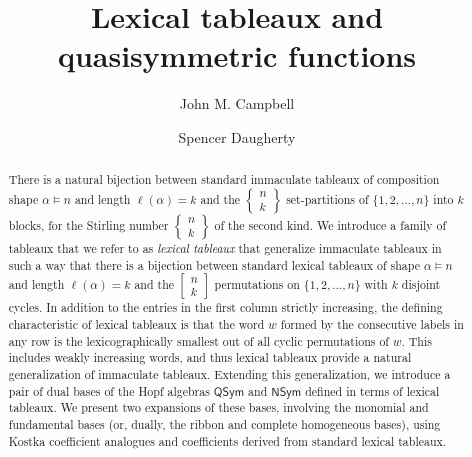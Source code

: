 \documentclass{amsart}
\title{Lexical tableaux and quasisymmetric functions}
\author[J. M. Campbell]{John M. Campbell}\address{Department of Mathematics and Statistics, Dalhousie University, Halifax, NS}\email{jh241966@dal.ca}
\author[S. Daugherty]{Spencer Daugherty}\address{Department of Mathematics, University of Colorado Boulder, Boulder, CO}\email{spencer.daugherty@colorado.edu}
\theoremstyle{definition}
\begin{document}
\maketitle

\begin{abstract}
 There is a natural bijection between standard immaculate tableaux of composition shape $\alpha \vDash n$ and length $\ell(\alpha) = 
 k$ and the $ \left\{ \begin{smallmatrix} n \\ k \end{smallmatrix} \right\} $ set-partitions of $\{ 1, 2, \ldots, n \}$ into $k$ blocks, for the 
 Stirling number $ \left\{ \begin{smallmatrix} n \\ k \end{smallmatrix} \right\} $ of the second kind. We introduce a family of tableaux that 
 we refer to as \emph{lexical tableaux} that generalize immaculate tableaux in such a way that there is a bijection between standard 
 lexical tableaux of shape $\alpha \vDash n$ and length $\ell(\alpha) = k$ and the $ \left[ \begin{smallmatrix} n \\ k \end{smallmatrix} 
 \right] $ permutations on $\{ 1, 2, \ldots, n \}$ with $k$ disjoint cycles. In addition to the entries in the first column strictly increasing, the defining characteristic of lexical tableaux is that the word $w$ formed by the consecutive labels in any row is 
 the lexicographically smallest out of all cyclic permutations of $w$. This includes weakly increasing words, and thus  lexical tableaux provide a natural generalization of immaculate tableaux. Extending this generalization, we introduce a pair of dual bases of the Hopf algebras 
 $\textsf{QSym}$ and $\textsf{NSym}$ defined in terms of lexical tableaux. We present two expansions of these bases, involving the monomial and fundamental bases (or,  dually,  the ribbon and complete homogeneous bases), using Kostka coefficient analogues and coefficients derived from standard lexical tableaux. 
\end{abstract}

\vspace{0.1in}


\vspace{0.1in}

\end{document}
